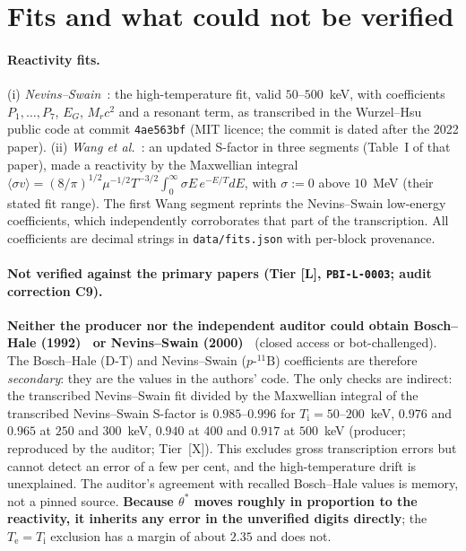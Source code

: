 \documentclass[10pt]{article}
\newcommand{\tier}[1]{\textsf{[#1]}}
\newcommand{\tL}{\tier{L}}
\newcommand{\tX}{\tier{X}}
\newcommand{\Te}{T_{\mathrm e}}
\newcommand{\Ti}{T_{\mathrm i}}
\newcommand{\pB}{p\text{-}{}^{11}\mathrm{B}}
\begin{document}
\section{Fits and what could not be verified}\label{sec:fits}
\paragraph{Reactivity fits.} (i) \emph{Nevins--Swain~\cite{ns}}: the high-temperature fit, valid $50$--$500$~keV, with coefficients $P_1,\dots,P_7$, $E_G$, $M_rc^2$ and a resonant term, as transcribed in the Wurzel--Hsu public code at commit \texttt{4ae563bf} (MIT licence; the commit is dated after the 2022 paper). (ii) \emph{Wang et al.~\cite{wang}}: an updated S-factor in three segments (Table~I of that paper), made a reactivity by the Maxwellian integral $\langle\sigma v\rangle=(8/\pi)^{1/2}\mu^{-1/2}T^{-3/2}\!\int_0^\infty\sigma E\,e^{-E/T}dE$, with $\sigma:=0$ above $10$~MeV (their stated fit range). The first Wang segment reprints the Nevins--Swain low-energy coefficients, which independently corroborates that part of the transcription. All coefficients are decimal strings in \texttt{data/fits.json} with per-block provenance.

\paragraph{Not verified against the primary papers (Tier \tL{}, \texttt{PBI-L-0003}; audit correction C9).} \textbf{Neither the producer nor the independent auditor could obtain Bosch--Hale (1992)~\cite{bh} or Nevins--Swain (2000)~\cite{ns}} (closed access or bot-challenged). The Bosch--Hale (D-T) and Nevins--Swain ($\pB$) coefficients are therefore \emph{secondary}: they are the values in the authors' code. The only checks are indirect: the transcribed Nevins--Swain fit divided by the Maxwellian integral of the transcribed Nevins--Swain S-factor is $0.985$--$0.996$ for $\Ti=50$--$200$~keV, $0.976$ and $0.965$ at $250$ and $300$~keV, $0.940$ at $400$ and $0.917$ at $500$~keV (producer; reproduced by the auditor; Tier~\tX{}). This excludes gross transcription errors but cannot detect an error of a few per cent, and the high-temperature drift is unexplained. The auditor's agreement with recalled Bosch--Hale values is memory, not a pinned source. \textbf{Because $\theta^\ast$ moves roughly in proportion to the reactivity, it inherits any error in the unverified digits directly}; the $\Te=\Ti$ exclusion has a margin of about $2.35$ and does not.
\end{document}
